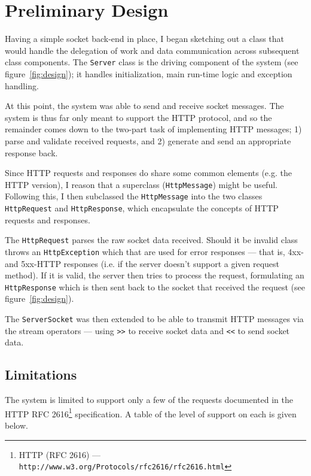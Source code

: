 \documentclass{acm_proc_article-sp}
\newcommand{\code}[1]{{\tt #1}}
\newcommand{\figref}[1]{(see figure~\ref{#1})}
\begin{document}
\balancecolumns

\section{Preliminary Design}
\label{sec:design|sub:preliminary-design}
Having a simple socket back-end in place, I began sketching out a class that
would handle the delegation of work and data communication across subsequent
class components. The \code{Server} class is the driving component of the
system \figref{fig:design}; it handles initialization, main run-time logic and
exception handling.

At this point, the system was able to send and receive socket messages. The
system is thus far only meant to support the HTTP protocol, and so the
remainder comes down to the two-part task of implementing HTTP messages; 1)
parse and validate received requests, and 2) generate and send an appropriate
response back.

Since HTTP requests and responses do share some common elements (e.g. the HTTP
version), I reason that a superclass (\code{HttpMessage}) might be useful.
Following this, I then subclassed the \code{HttpMessage} into the two classes
\code{HttpRequest} and \code{HttpResponse}, which encapsulate the concepts of
HTTP requests and responses.

The \code{HttpRequest} parses the raw socket data received. Should it be
invalid class throws an \code{HttpException} which that are used for error
responses --- that is, 4xx- and 5xx-HTTP responses (i.e. if the server doesn't
support a given request method). If it is valid, the server then tries to
process the request, formulating an \code{HttpResponse} which is then sent
back to the socket that received the request \figref{fig:design}.

The \code{ServerSocket} was then extended to be able to transmit HTTP messages
via the stream operators --- using \code{{>}{>}} to receive socket data and
\code{{<}{<}} to send socket data.

\subsection{Limitations}
\label{sec:design|sub:limitations}
The system is limited to support only a few of the requests documented in
the HTTP RFC 2616\footnote{HTTP (RFC 2616) ---
{\tt http://www.w3.org/Protocols/rfc2616/rfc2616.html}} specification. A table
of the level of support on each is given below.
\end{document}
